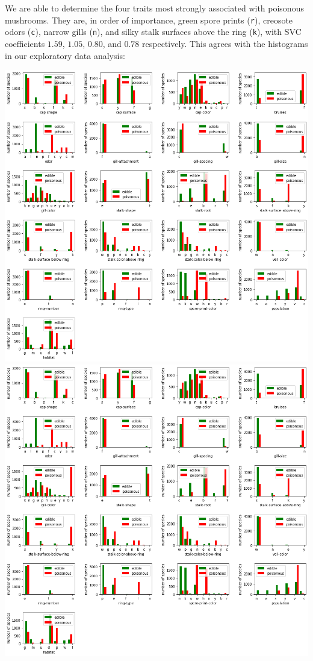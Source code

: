 \documentclass[11pt]{article}
\begin{document}
We are able to determine the four traits most strongly associated with
poisonous mushrooms. They are, in order of importance, green spore prints
(\texttt{r}), creosote odors (\texttt{c}), narrow gills (\texttt{n}), and
silky stalk surfaces above the ring (\texttt{k}), with SVC coefficients
$1.59$, $1.05$, $0.80$, and $0.78$ respectively.
This agrees with the histograms in our exploratory data analysis:
\begin{center}
\includegraphics[scale=0.8,trim=460 150 220 570,clip=true]{histograms.png}
\includegraphics[scale=0.8,trim=0 585 680 135,clip=true]{histograms.png}


\end{center}
\end{document}
